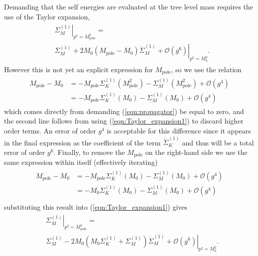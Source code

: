 \documentclass[11pt]{article}
\renewcommand{\d}{\ensuremath{\operatorname{d}\!}}
\def\Mp{M_{\text{pole}}}
\begin{document}
Demanding that the self energies are evaluated at the tree level mass requires the use of the Taylor expansion,
\begin{align}
\begin{split}
&\left.\Sigma^{(1)}_M\right|_{p^2=\Mp^2}=\\&\left.\Sigma^{(1)}_M+2M_0(\Mp-M_0)\dot{\Sigma}^{(1)}_M+\mathcal{O}\left(g^6\right)\right|_{p^2=M_0^2}. \label{eqn:Taylor_expansion1}
\end{split}
\end{align}
However this is not yet an explicit expression for $\Mp$, so we use the relation
\begin{align}
\begin{split}
\Mp-M_0&=-\Mp\Sigma^{(1)}_K(\Mp^2)-\Sigma^{(1)}_M(\Mp^2)+\mathcal{O}(g^4)\\
&=-\Mp\Sigma^{(1)}_K(M_0)-\Sigma^{(1)}_M(M_0)+\mathcal{O}(g^4)\label{eqn:mass_diff}
\end{split}
\end{align}
which comes directly from demanding  (\ref{eqn:propagator}) be equal to zero, and the second line follows from using (\ref{eqn:Taylor_expansion1}) to discard higher order terms.  An error of order $g^4$ is acceptable for this difference since it appears in the final expression as the coefficient of the term $\dot{\Sigma}^{(1)}_K$ and thus will be a total error of order $g^6$.  Finally, to remove the $\Mp$ on the right-hand side we use the same expression within itself (effectively iterating)
\begin{align}
\begin{split}
\Mp-M_0&=-\Mp\Sigma^{(1)}_K(M_0)-\Sigma^{(1)}_M(M_0)+\mathcal{O}(g^4)\\
&=-M_0\Sigma^{(1)}_K(M_0)-\Sigma^{(1)}_M(M_0)+\mathcal{O}(g^4)\label{eqn:M0Mp}\\
\end{split}
\end{align}
substituting this result into (\ref{eqn:Taylor_expansion1}) gives
\begin{align}
\begin{split}
&\left.\Sigma^{(1)}_M\right|_{p^2=\Mp^2}=\\ &\left.\Sigma^{(1)}_M-2M_0(M_0\Sigma^{(1)}_K+\Sigma^{(1)}_M)\dot{\Sigma}^{(1)}_M+\mathcal{O}\left(g^6\right)\right|_{p^2=M_0^2}.
\end{split}
\end{align}
\end{document}
